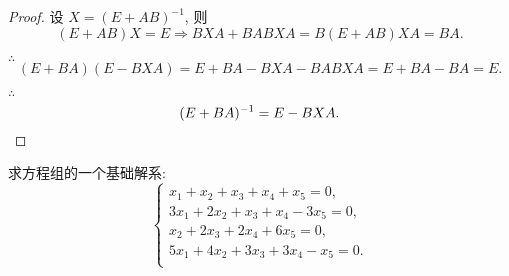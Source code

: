 \documentclass[color=black,device=normal,lang=cn,mode=geye]{elegantnote}
\begin{document}
\begin{proof}
    设 $X=(E+AB)^{-1}$, 则
    \[(E+AB)X=E\Rightarrow BXA+BABXA=B(E+AB)XA=BA.\]

    $\therefore$
    \[(E+BA)(E-BXA)=E+BA-BXA-BABXA=E+BA-BA=E.\]

    $\therefore$
    \[(E+BA)^{-1}=E-BXA.\qedhere\]
\end{proof}
\begin{exercisec}[3.5.1]
    求方程组的一个基础解系:
    \[\begin{cases}
        x_1+x_2+x_3+x_4+x_5=0, \\
        3x_1+2x_2+x_3+x_4-3x_5=0, \\
        x_2+2x_3+2x_4+6x_5=0, \\
        5x_1+4x_2+3x_3+3x_4-x_5=0. \\
    \end{cases}\]
\end{exercisec}
\end{document}
